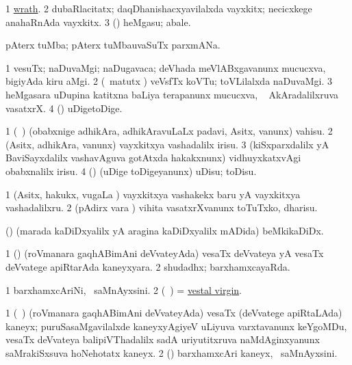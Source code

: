 \noindent 
\gl{\pagu}
\expl{}
\bmng
\bnum
\num{1}  \hyperref{kandict_w.pdf}{W}{wrath pagu(2)}{wrath}. 
\num{2}  dubaRlacitatx; daqDhanishacxyavilalxda vayxkitx; necicxkege anahaRnAda vayxkitx. 
\num{3}  (\beY) heMgasu; abale. 
\enum
\emng
\eentry

\bentry 
{} 
\gl{\nA}
\expl{}
\bmng
 pAterx tuMba; pAterx tuMbauvaSuTx parxmANa. 
\emng
\eentry

\bentry
{} 
\gl{\nA}
\bmng
{} 
\bnum
\num{1} vesuTx; naDuvaMgi; naDugavaca; deVhada meVlABxgavanunx mucucxva, bigiyAda kiru aMgi.  
\num{2} (\AseTxrXV\ matutx \ame) veVsfTx koVTu; toVLilalxda naDuvaMgi. 
\hypertarget{vest(1)3}{} 
\num{3} heMgasara uDupina katitxna baLiya terapanunx mucucxva, \sA\  AkAradalilxruva vasatxrX. 
\num{4} (\pArxparx) uDigetoDige. 
\enum
\emng
\eentry

\bentry
{} 
\gl{\sakirx}
\expl{}
\bmng
\bnum
\num{1} (\kanmu\ \kaparx) (obabxnige adhikAra, adhikAravuLaLx padavi, Asitx, \mo vanunx) vahisu. 
\num{2} (Asitx, adhikAra, \mo vanunx) vayxkitxya vashadalilx irisu. 
\num{3} (kiSxparxdalilx yA BaviSayxdalilx vashavAguva gotAtxda hakakxnunx) vidhuyxkatxvAgi obabxnalilx irisu. 
\num{4} (\kAparx) (uDige toDigeyanunx) uDisu; toDisu. 
\enum
\emng

\noindent 
\gl{\akirx}
\expl{}
\bmng
\bnum
\num{1} (Asitx, hakukx, \mo vugaLa \vi) vayxkitxya vashakekx baru yA vayxkitxya vashadalilxru. 
\num{2} (pAdirx \mo vara \vi) vihita vasatxrXvanunx toTuTxko, dharisu. 
\enum
\emng
\eentry

\bentry
{} 
\gl{\nA}
\expl{}
\bmng
 (\ca) (marada kaDiDxyalilx yA aragina kaDiDxyalilx mADida) beMkikaDiDx. 
\emng
\eentry

\bentry
{} 
\gl{\gu}
\expl{}
\bmng
\bnum
\num{1} (\roVpu) (roVmanara gaqhABimAni deVvateyAda) vesaTx deVvateya yA vesaTx deVvatege apiRtarAda kaneyxyara. 
\num{2} shudadhx; barxhamxcayaRda. 
\enum
\emng
\eentry

\bentry
{} 
\gl{\nA}
\expl{}
\bmng
\bnum
\num{1} barxhamxcAriNi, \kanmu\ saMnAyxsini. 
\num{2} (\roV\ \pArxkatx) = \hyperlink{vestal virgin}{vestal virgin}. 
\enum
\emng
\eentry

\bentry
{}
\gl{\nA}
\expl{}
\bmng
\bnum
\num{1} (\roV\ \pArxkatx) (roVmanara gaqhABimAni deVvateyAda) vesaTx (deVvatege apiRtaLAda) kaneyx; puruSasaMgavilalxde kaneyxyAgiyeV uLiyuva varxtavanunx keYgoMDu, vesaTx deVvateya balipiVThadalilx sadA uriyutitxruva naMdAginxyanunx saMrakiSxsuva hoNehotatx kaneyx. 
\num{2} (\rUpa) barxhamxcAri kaneyx, \kanmu\ saMnAyxsini. 
\enum
\emng
\eentry

